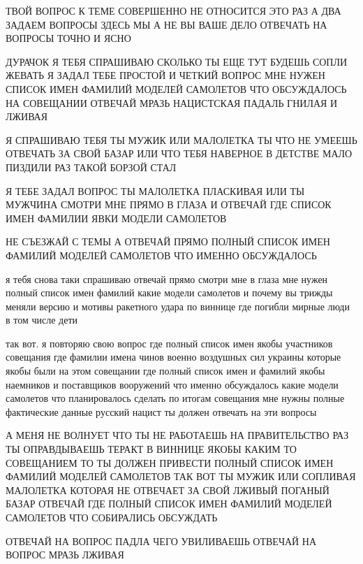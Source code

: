  
 
 
 
 

ТВОЙ ВОПРОС К ТЕМЕ СОВЕРШЕННО НЕ ОТНОСИТСЯ ЭТО РАЗ А ДВА ЗАДАЕМ ВОПРОСЫ ЗДЕСЬ
МЫ А НЕ ВЫ ВАШЕ ДЕЛО ОТВЕЧАТЬ НА ВОПРОСЫ ТОЧНО И ЯСНО

ДУРАЧОК Я ТЕБЯ СПРАШИВАЮ СКОЛЬКО ТЫ ЕЩЕ ТУТ БУДЕШЬ СОПЛИ ЖЕВАТЬ Я ЗАДАЛ ТЕБЕ
ПРОСТОЙ И ЧЕТКИЙ ВОПРОС МНЕ НУЖЕН СПИСОК ИМЕН ФАМИЛИЙ МОДЕЛЕЙ САМОЛЕТОВ ЧТО
ОБСУЖДАЛОСЬ НА СОВЕЩАНИИ ОТВЕЧАЙ МРАЗЬ НАЦИСТСКАЯ ПАДАЛЬ ГНИЛАЯ И ЛЖИВАЯ

Я СПРАШИВАЮ ТЕБЯ ТЫ МУЖИК ИЛИ МАЛОЛЕТКА ТЫ ЧТО НЕ УМЕЕШЬ ОТВЕЧАТЬ ЗА СВОЙ БАЗАР
ИЛИ ЧТО ТЕБЯ НАВЕРНОЕ В ДЕТСТВЕ МАЛО ПИЗДИЛИ РАЗ ТАКОЙ БОРЗОЙ СТАЛ

Я ТЕБЕ ЗАДАЛ ВОПРОС ТЫ МАЛОЛЕТКА ПЛАСКИВАЯ ИЛИ ТЫ МУЖЧИНА СМОТРИ МНЕ ПРЯМО В
ГЛАЗА И ОТВЕЧАЙ ГДЕ СПИСОК ИМЕН ФАМИЛИИ ЯВКИ МОДЕЛИ САМОЛЕТОВ

НЕ СЪЕЗЖАЙ С ТЕМЫ А ОТВЕЧАЙ ПРЯМО ПОЛНЫЙ СПИСОК ИМЕН ФАМИЛИЙ МОДЕЛЕЙ САМОЛЕТОВ
ЧТО ИМЕННО ОБСУЖДАЛОСЬ

я тебя снова таки спрашиваю отвечай прямо смотри мне в глаза мне нужен полный
список имен фамилий какие модели самолетов и почему вы трижды меняли версию и
мотивы ракетного удара по виннице где погибли мирные люди в том числе дети

так вот. я повторяю свою вопрос где полный список имен якобы участников
совещания где фамилии имена чинов военно воздушных сил украины которые якобы
были на этом совещании где полный список имен и фамилий якобы наемников и
поставщиков вооружений что именно обсуждалось какие модели самолетов что
планировалось сделать по итогам совещания мне нужны полные фактические данные
русский нацист ты должен отвечать на эти вопросы

А МЕНЯ НЕ ВОЛНУЕТ ЧТО ТЫ НЕ РАБОТАЕШЬ НА ПРАВИТЕЛЬСТВО РАЗ ТЫ ОПРАВДЫВАЕШЬ
ТЕРАКТ В ВИННИЦЕ ЯКОБЫ КАКИМ ТО СОВЕЩАНИЕМ ТО ТЫ ДОЛЖЕН ПРИВЕСТИ ПОЛНЫЙ СПИСОК
ИМЕН ФАМИЛИЙ МОДЕЛЕЙ САМОЛЕТОВ ТАК ВОТ ТЫ МУЖИК ИЛИ СОПЛИВАЯ МАЛОЛЕТКА КОТОРАЯ
НЕ ОТВЕЧАЕТ ЗА СВОЙ ЛЖИВЫЙ ПОГАНЫЙ БАЗАР ОТВЕЧАЙ ГДЕ ПОЛНЫЙ СПИСОК ИМЕН ФАМИЛИЙ
МОДЕЛЕЙ САМОЛЕТОВ ЧТО СОБИРАЛИСЬ ОБСУЖДАТЬ

ОТВЕЧАЙ НА ВОПРОС ПАДЛА ЧЕГО УВИЛИВАЕШЬ ОТВЕЧАЙ НА ВОПРОС МРАЗЬ ЛЖИВАЯ

